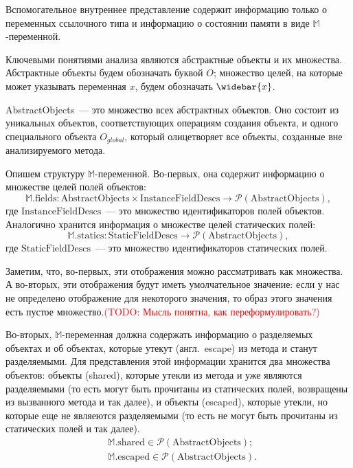 \documentclass[14pt,titlepage]{extarticle}
\newcommand{\M}{\ensuremath{\mathbb{M}}}
\newcommand{\Mfield}[1]{\textrm{#1}}
\newcommand{\Mhyp}{$\mathbb{M}$\hyp}
\newcommand{\pts}[1]{\widebar{#1}}
\newcommand{\powerset}[1]{\mathcal{P}(#1)}
\newcommand{\todo}[1]{\textcolor{red}{(\eng{TODO}: #1)}}
\newcommand{\eng}[1]{{\English#1}}
\newcommand{\engdef}[1]{(англ.~\eng{#1})}
\begin{document}
    Вспомогательное внутреннее представление содержит информацию только о
    переменных ссылочного типа и информацию о состоянии памяти в виде
    \Mhyp переменной.

    Ключевыми понятиями анализа являются абстрактные объекты и их множества.
    Абстрактные объекты будем обозначать буквой $O$; множество целей, на
    которые может указывать переменная $x$, будем обозначать $\pts{x}$.

    \textrm{AbstractObjects}~--- это множество всех абстрактных объектов. Оно
    состоит из уникальных объектов, соответствующих операциям создания объекта,
    и одного специального объекта $O_{global}$, который олицетворяет все
    объекты, созданные вне анализируемого метода.

    Опишем структуру \Mhyp переменной. Во-первых, она содержит информацию о
    множестве целей полей объектов:
    \[ \M.\Mfield{fields}\colon
      \textrm{AbstractObjects} \times \textrm{InstanceFieldDescs} \to
      \powerset{\textrm{AbstractObjects}},
    \]
    где $\textrm{InstanceFieldDescs}$~--- это множество идентификаторов полей
    объектов.
    Аналогично хранится информация о множестве целей статических полей:
    \[ \M.\Mfield{statics}\colon
      \textrm{StaticFieldDescs} \to
      \powerset{\textrm{AbstractObjects}},
    \]
    где $\textrm{StaticFieldDescs}$~--- это множество идентификаторов
    статических полей.

    Заметим, что, во-первых, эти отображения можно рассматривать как множества.
    А во-вторых, эти отображения будут иметь умолчательное значение: если у нас
    не определено отображение для некоторого значения, то образ этого значения
    есть пустое множество.\todo{Мысль понятна, как переформулировать?}

    Во-вторых, \Mhyp переменная должна содержать информацию о разделяемых
    объектах и об объектах, которые утекут \engdef{escape} из метода и станут
    разделяемыми. Для представления этой информации хранится два множества
    объектов: объекты (\eng{shared}), которые утекли из метода и уже являются
    разделяемыми (то есть могут быть прочитаны из статических полей, возвращены
    из вызванного метода и так далее), и объекты (\eng{escaped}), которые
    утекли, но которые еще не являеются разделяемыми (то есть не могут быть
    прочитаны из статических полей и так далее).
    \[\begin{aligned}
      &\M.\Mfield{shared} \in \powerset{\textrm{AbstractObjects}}; \\
      &\M.\Mfield{escaped} \in \powerset{\textrm{AbstractObjects}}.
    \end{aligned}\]
\end{document}
